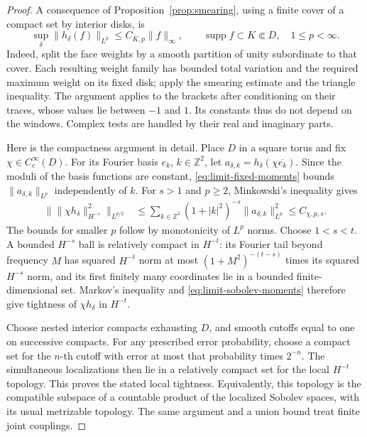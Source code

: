 \documentclass[11pt]{article}
\theoremstyle{definition}
\theoremstyle{remark}
\numberwithin{equation}{section}
\begin{document}
\begin{proof}
A consequence of Proposition~\ref{prop:smearing}, using a finite
cover of a compact set by interior disks, is
\begin{equation}
 \sup_\delta\|h_\delta(f)\|_{L^p}
 \le C_{K,p}\|f\|_\infty,\qquad
 \operatorname{supp} f\subset K\Subset D,\quad 1\le p<\infty.
 \label{eq:limit-fixed-moments}
\end{equation}
Indeed, split the face weights by a smooth partition of unity
subordinate to that cover.  Each resulting weight family has bounded
total variation and the required maximum weight on its fixed disk;
apply the smearing estimate and the triangle inequality.  The argument
applies to the brackets after conditioning on their traces, whose
values lie between \(-1\) and \(1\).  Its constants thus do not depend
on the windows.  Complex tests are handled by their real and imaginary
parts.

Here is the compactness argument in detail.  Place \(D\) in a square
torus and fix \(\chi\in C_c^\infty(D)\).  For its Fourier basis
\(e_k\), \(k\in\mathbb Z^2\), let
\(a_{\delta,k}=h_\delta(\chi\overline{e_k})\).  Since the moduli of the
basis functions are constant, \eqref{eq:limit-fixed-moments} bounds
\(\|a_{\delta,k}\|_{L^p}\) independently of \(k\).  For \(s>1\) and
\(p\ge2\), Minkowski's inequality gives
\begin{align}
 \bigl\|\|\chi h_\delta\|_{H^{-s}}^2\bigr\|_{L^{p/2}}
 &\le
 \sum_{k\in\mathbb Z^2}(1+|k|^2)^{-s}
             \|a_{\delta,k}\|_{L^p}^2
 \le C_{\chi,p,s}.
 \label{eq:limit-sobolev-moments}
\end{align}
The bounds for smaller \(p\) follow by monotonicity of \(L^p\) norms.
Choose \(1<s<t\).  A bounded \(H^{-s}\) ball is relatively compact
in \(H^{-t}\): its Fourier tail beyond frequency \(M\) has squared
\(H^{-t}\) norm at most
\((1+M^2)^{-(t-s)}\) times its squared \(H^{-s}\) norm, and its
first finitely many coordinates lie in a bounded finite-dimensional
set.  Markov's inequality and \eqref{eq:limit-sobolev-moments}
therefore give tightness of \(\chi h_\delta\) in \(H^{-t}\).

Choose nested interior compacts exhausting \(D\), and smooth cutoffs
equal to one on successive compacts.  For any prescribed error
probability, choose a compact set for the \(n\)-th cutoff with error
at most that probability times \(2^{-n}\).  The simultaneous
localizations then lie in a relatively compact set for the local
\(H^{-t}\) topology.  This proves the stated local tightness.
Equivalently, this topology is the compatible subspace of a countable
product of the localized Sobolev spaces, with its usual metrizable
topology.  The same argument and a union bound treat finite joint
couplings.


\end{proof}
\end{document}
